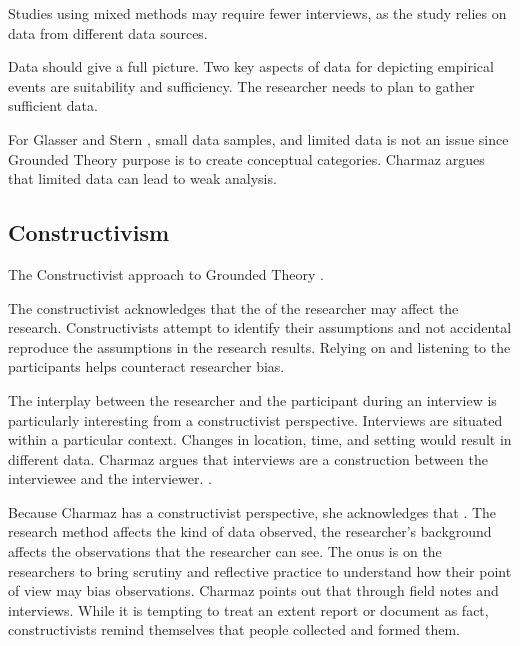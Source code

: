 Studies using mixed methods may require fewer interviews, as the study relies on data from different data sources.

Data should give a full picture. Two key aspects of data for depicting empirical events are suitability and sufficiency.  The researcher needs to plan to gather sufficient data. 

For Glasser \cite{GlaserIssues} and Stern \cite{SternErodingGroundedTheory}, small data samples, and limited data is not an issue since Grounded Theory purpose is to create conceptual categories. Charmaz argues that limited data can lead to weak analysis. 

\subsection{Constructivism}
The Constructivist approach to Grounded Theory  \cite{StolGroundedTheory}. 

The constructivist acknowledges that the  of the researcher may affect the research. Constructivists attempt to identify their assumptions and not accidental reproduce the assumptions in the research results. Relying on and listening to the participants helps counteract researcher bias.

The interplay between the researcher and the participant during an interview is particularly interesting from a constructivist perspective. Interviews are situated within a particular context. Changes in location, time, and setting would result in different data.  Charmaz argues that interviews are a construction between the interviewee and the interviewer.  \cite{Charmaz}.

Because Charmaz has a constructivist perspective, she acknowledges that  \cite{Charmaz}. The research method affects the kind of data observed, the researcher's background affects the observations that the researcher can see. The onus is on the researchers to bring scrutiny and reflective practice to understand how their point of view may bias observations. Charmaz points out that  through field notes and interviews. While it is tempting to treat an extent report or document as fact, constructivists remind themselves that people collected and formed them.

